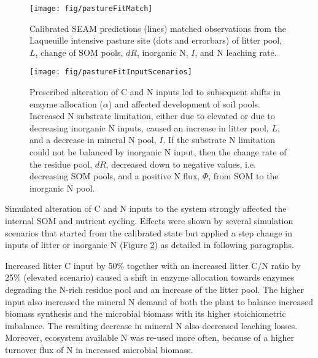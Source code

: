 \begin{figure}[t] \vspace*{2mm}
\begin{center}
\texttt{[image: fig/pastureFitMatch]} 
\end{center}
\caption{
Calibrated SEAM predictions (lines)  matched observations from the
Laqueuille intensive pasture site (dots and errorbars) of litter pool, $L$, change of
SOM pools, $dR$, inorganic N, $I$, and N leaching rate.
\label{fig:pastureFitMatch}}
\end{figure}

\begin{figure}[t] \vspace*{2mm}
\begin{center}
\texttt{[image: fig/pastureFitInputScenarios]} 
\end{center}
\caption{
Prescribed alteration of C and N inputs led to subsequent shifts in enzyme
allocation ($\alpha$) and affected development of soil pools.
Increased N substrate limitation, either due to elevated  or due to
decreasing inorganic N inputs, caused an increase in litter pool, $L$, and a
decrease in mineral N pool, $I$. If the substrate N limitation could not be
balanced by inorganic N input, then the change rate of the residue pool, $dR$,
decreased down to negative values, i.e. decreasing SOM pools, and a
positive N flux, $\Phi$, from SOM to the inorganic N pool.
\label{fig:pastureFitScen}} 
\end{figure}   
   
Simulated alteration of C and N inputs to the system strongly affected the
internal SOM and nutrient cycling. Effects were shown by several
simulation scenarios that started from the calibrated state but applied a step change in
inputs of litter or inorganic N (Figure \ref{fig:pastureFitScen}) as detailed
in following paragraphs.

Increased litter C input by 50\% together with an increased litter C/N ratio by
25\% (elevated  scenario) caused a shift in enzyme allocation towards
enzymes degrading the N-rich residue pool and an increase of the litter pool.
The higher input also increased the mineral N demand of both the plant to
balance increased biomass synthesis and the microbial biomass with its higher
stoichiometric imbalance. The resulting decrease in mineral N also decreased
leaching losses. Moreover, ecosystem available N was re-used more often, because
of a higher turnover flux of N in increased microbial biomass.

